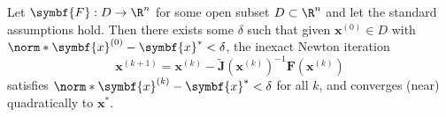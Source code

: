 \documentclass{article}
\begin{document}
\begin{theorem}
    Let \(\symbf{F} : D \to \R^n\) for some open subset \(D \subset \R^n\)
    and let the standard assumptions hold. Then there exists some \(\delta\)
    such that given \(\symbf{x}^{\left( 0 \right)} \in D\) with
    \(\norm*{\symbf{x}^{\left( 0 \right)} - \symbf{x}^\ast} < \delta\),
    the inexact Newton iteration
    \begin{equation*}
        \symbf{x}^{\left( k + 1 \right)} = \symbf{x}^{\left( k \right)} - \tilde{\symbf{J}}\left( \symbf{x}^{\left( k \right)} \right)^{-1} \symbf{F}\left( \symbf{x}^{\left( k \right)} \right)
    \end{equation*}
    satisfies \(\norm*{\symbf{x}^{\left( k \right)} - \symbf{x}^\ast} < \delta\)
    for all \(k\), and converges (near) quadratically to \(\symbf{x}^\ast\).
\end{theorem}
\end{document}
